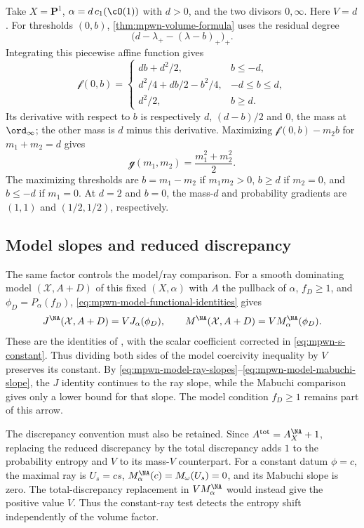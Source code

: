 \noindent\begin{minipage}{\linewidth}
\begin{example}
\label{ex:dict-degree-d-contact-masses}
Take $X=\mathbf P^1$, $\alpha=d\,c_1(\cO(1))$ with $d>0$, and the two divisors $0,\infty$. Here $V=d$. For thresholds $(0,b)$, \cref{thm:mpwn-volume-formula} uses the residual degree
\[
                    \bigl(d-\lambda_+-(\lambda-b)_+\bigr)_+.
\]
Integrating this piecewise affine function gives
\[
 \mathscr f(0,b)=
 \begin{cases}
   db+d^2/2,&b\leq-d,\\
   d^2/4+db/2-b^2/4,&-d\leq b\leq d,\\
   d^2/2,&b\geq d.
 \end{cases}
\]
Its derivative with respect to $b$ is respectively $d$, $(d-b)/2$ and $0$, the mass at $\ord_\infty$; the other mass is $d$ minus this derivative. Maximizing $\mathscr f(0,b)-m_2b$ for $m_1+m_2=d$ gives
\[
                    \mathscr g(m_1,m_2)=\frac{m_1^2+m_2^2}{2}.
\]
The maximizing thresholds are $b=m_1-m_2$ if $m_1m_2>0$, $b\geq d$ if $m_2=0$, and $b\leq-d$ if $m_1=0$. At $d=2$ and $b=0$, the mass-$d$ and probability gradients are $(1,1)$ and $(1/2,1/2)$, respectively.
\end{example}
\end{minipage}

\subsection{Model slopes and reduced discrepancy}
\label{subsec:dict-raw-model-slopes}

The same factor controls the model/ray comparison. For a smooth dominating model $(\mathcal X,A+D)$ of this fixed $(X,\alpha)$ with $A$ the pullback of $\alpha$, $f_D\geq1$, and $\phi_D=P_\alpha(f_D)$, \eqref{eq:mpwn-model-functional-identities} gives
\[
 J^{\NA}(\mathcal X,A+D)=VJ_\alpha(\phi_D),\qquad
 M^{\NA}(\mathcal X,A+D)=VM_\alpha^{\NA}(\phi_D).
\]
These are the identities of \cite[Theorem~9.1.1, p.~31]{MPWN25}, with the scalar coefficient corrected in \eqref{eq:mpwn-s-constant}. Thus dividing both sides of the model coercivity inequality by $V$ preserves its constant. By \eqref{eq:mpwn-model-ray-slopes}--\eqref{eq:mpwn-model-mabuchi-slope}, the $J$ identity continues to the ray slope, while the Mabuchi comparison gives only a lower bound for that slope. The model condition $f_D\geq1$ remains part of this arrow.

The discrepancy convention must also be retained. Since $A^{\mathrm{tot}}=A_X^{\NA}+1$, replacing the reduced discrepancy by the total discrepancy adds $1$ to the probability entropy and $V$ to its mass-$V$ counterpart. For a constant datum $\phi=c$, the maximal ray is $U_s=cs$, $M_\alpha^{\NA}(c)=M_\omega(U_s)=0$, and its Mabuchi slope is zero. The total-discrepancy replacement in $VM_\alpha^{\NA}$ would instead give the positive value $V$. Thus the constant-ray test detects the entropy shift independently of the volume factor.


